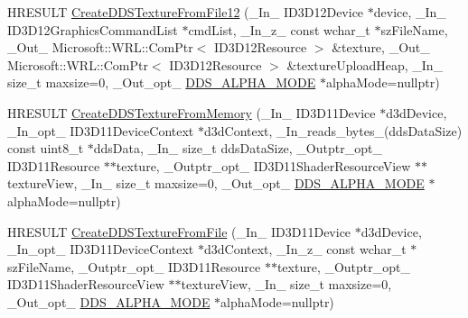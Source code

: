 \begin{DoxyCompactItemize}
\item 
H\+R\+E\+S\+U\+LT \hyperlink{namespace_direct_x_a256abd853d439601f0990802d1465da7_a256abd853d439601f0990802d1465da7}{Create\+D\+D\+S\+Texture\+From\+File12} (\+\_\+\+In\+\_\+ I\+D3\+D12\+Device $\ast$device, \+\_\+\+In\+\_\+ I\+D3\+D12\+Graphics\+Command\+List $\ast$cmd\+List, \+\_\+\+In\+\_\+z\+\_\+ const wchar\+\_\+t $\ast$sz\+File\+Name, \+\_\+\+Out\+\_\+ Microsoft\+::\+W\+R\+L\+::\+Com\+Ptr$<$ I\+D3\+D12\+Resource $>$ \&texture, \+\_\+\+Out\+\_\+ Microsoft\+::\+W\+R\+L\+::\+Com\+Ptr$<$ I\+D3\+D12\+Resource $>$ \&texture\+Upload\+Heap, \+\_\+\+In\+\_\+ size\+\_\+t maxsize=0, \+\_\+\+Out\+\_\+opt\+\_\+ \hyperlink{namespace_direct_x_a7cb48689d75471680c0bf7f79caaaf1f_a7cb48689d75471680c0bf7f79caaaf1f}{D\+D\+S\+\_\+\+A\+L\+P\+H\+A\+\_\+\+M\+O\+DE} $\ast$alpha\+Mode=nullptr)
\item 
H\+R\+E\+S\+U\+LT \hyperlink{namespace_direct_x_a597be68a8cd5caf647a21e3d54230a91_a597be68a8cd5caf647a21e3d54230a91}{Create\+D\+D\+S\+Texture\+From\+Memory} (\+\_\+\+In\+\_\+ I\+D3\+D11\+Device $\ast$d3d\+Device, \+\_\+\+In\+\_\+opt\+\_\+ I\+D3\+D11\+Device\+Context $\ast$d3d\+Context, \+\_\+\+In\+\_\+reads\+\_\+bytes\+\_\+(dds\+Data\+Size) const uint8\+\_\+t $\ast$dds\+Data, \+\_\+\+In\+\_\+ size\+\_\+t dds\+Data\+Size, \+\_\+\+Outptr\+\_\+opt\+\_\+ I\+D3\+D11\+Resource $\ast$$\ast$texture, \+\_\+\+Outptr\+\_\+opt\+\_\+ I\+D3\+D11\+Shader\+Resource\+View $\ast$$\ast$texture\+View, \+\_\+\+In\+\_\+ size\+\_\+t maxsize=0, \+\_\+\+Out\+\_\+opt\+\_\+ \hyperlink{namespace_direct_x_a7cb48689d75471680c0bf7f79caaaf1f_a7cb48689d75471680c0bf7f79caaaf1f}{D\+D\+S\+\_\+\+A\+L\+P\+H\+A\+\_\+\+M\+O\+DE} $\ast$alpha\+Mode=nullptr)
\item 
H\+R\+E\+S\+U\+LT \hyperlink{namespace_direct_x_af625c91d9244b4829f140665e00acc57_af625c91d9244b4829f140665e00acc57}{Create\+D\+D\+S\+Texture\+From\+File} (\+\_\+\+In\+\_\+ I\+D3\+D11\+Device $\ast$d3d\+Device, \+\_\+\+In\+\_\+opt\+\_\+ I\+D3\+D11\+Device\+Context $\ast$d3d\+Context, \+\_\+\+In\+\_\+z\+\_\+ const wchar\+\_\+t $\ast$sz\+File\+Name, \+\_\+\+Outptr\+\_\+opt\+\_\+ I\+D3\+D11\+Resource $\ast$$\ast$texture, \+\_\+\+Outptr\+\_\+opt\+\_\+ I\+D3\+D11\+Shader\+Resource\+View $\ast$$\ast$texture\+View, \+\_\+\+In\+\_\+ size\+\_\+t maxsize=0, \+\_\+\+Out\+\_\+opt\+\_\+ \hyperlink{namespace_direct_x_a7cb48689d75471680c0bf7f79caaaf1f_a7cb48689d75471680c0bf7f79caaaf1f}{D\+D\+S\+\_\+\+A\+L\+P\+H\+A\+\_\+\+M\+O\+DE} $\ast$alpha\+Mode=nullptr)
\item 

\end{DoxyCompactItemize}
